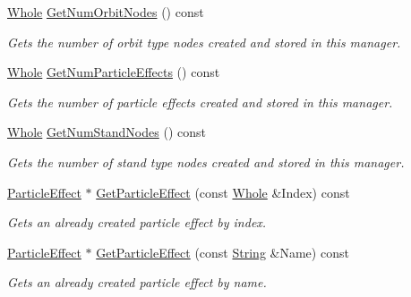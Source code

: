 \begin{DoxyCompactItemize}
\hyperlink{namespaceMezzanine_adcbb6ce6d1eb4379d109e51171e2e493}{Whole} \hyperlink{classMezzanine_1_1SceneManager_a4ad0850722dd634dddf4c00d2810be49}{GetNumOrbitNodes} () const 
\begin{DoxyCompactList}\small\item\em Gets the number of orbit type nodes created and stored in this manager. \item\end{DoxyCompactList}\item 
\hyperlink{namespaceMezzanine_adcbb6ce6d1eb4379d109e51171e2e493}{Whole} \hyperlink{classMezzanine_1_1SceneManager_a730f48b359f0028d7db491facd95d95d}{GetNumParticleEffects} () const 
\begin{DoxyCompactList}\small\item\em Gets the number of particle effects created and stored in this manager. \item\end{DoxyCompactList}\item 
\hyperlink{namespaceMezzanine_adcbb6ce6d1eb4379d109e51171e2e493}{Whole} \hyperlink{classMezzanine_1_1SceneManager_a54c1f5986486dc64e18475f84f49f9f0}{GetNumStandNodes} () const 
\begin{DoxyCompactList}\small\item\em Gets the number of stand type nodes created and stored in this manager. \item\end{DoxyCompactList}\item 
\hyperlink{classMezzanine_1_1ParticleEffect}{ParticleEffect} $\ast$ \hyperlink{classMezzanine_1_1SceneManager_a2e23ffc9c81b105ebf476e81dbcde74d}{GetParticleEffect} (const \hyperlink{namespaceMezzanine_adcbb6ce6d1eb4379d109e51171e2e493}{Whole} \&Index) const 
\begin{DoxyCompactList}\small\item\em Gets an already created particle effect by index. \item\end{DoxyCompactList}\item 
\hyperlink{classMezzanine_1_1ParticleEffect}{ParticleEffect} $\ast$ \hyperlink{classMezzanine_1_1SceneManager_a3a6f2b9e9b442fdee17fd4d934d08d85}{GetParticleEffect} (const \hyperlink{namespaceMezzanine_acf9fcc130e6ebf08e3d8491aebcf1c86}{String} \&Name) const 
\begin{DoxyCompactList}\small\item\em Gets an already created particle effect by name. \item\end{DoxyCompactList}\item 

\end{DoxyCompactItemize}

